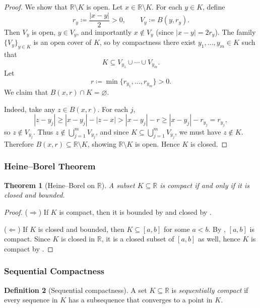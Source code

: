 \documentclass[12pt]{article}
\numberwithin{equation}{section}
\def\abs#1{|#1|}
\newcommand{\RR}{\mathbb{R}}
\let\emptyset\varnothing
\DeclarePairedDelimiter{\abs}{\lvert}{\rvert}
\theoremstyle{plain}
\newtheorem{theorem}{Theorem}[section]
\theoremstyle{definition}
\newtheorem{definition}[theorem]{Definition}
\theoremstyle{remark}
\begin{document}
\begin{proof}
We show that $\RR\setminus K$ is open.
Let $x\in \RR\setminus K$. For each $y\in K$, define
\[
r_y \coloneqq \frac{\abs{x-y}}{2} > 0,
\qquad
V_y \coloneqq B(y,r_y).
\]
Then $V_y$ is open, $y\in V_y$, and importantly $x\notin V_y$ (since $\abs{x-y}=2r_y$).
The family $\{V_y\}_{y\in K}$ is an open cover of $K$, so by compactness there exist $y_1,\dots,y_m\in K$ such that
\[
K \subseteq V_{y_1}\cup\cdots\cup V_{y_m}.
\]
Let
\[
r \coloneqq \min\{r_{y_1},\dots,r_{y_m}\} > 0.
\]
We claim that $B(x,r)\cap K=\emptyset$.

Indeed, take any $z\in B(x,r)$. For each $j$,
\[
\abs{z-y_j} \ge \abs{x-y_j} - \abs{z-x} > \abs{x-y_j} - r \ge \abs{x-y_j} - r_{y_j} = r_{y_j},
\]
so $z\notin V_{y_j}$.
Thus $z\notin \bigcup_{j=1}^m V_{y_j}$, and since $K\subseteq \bigcup_{j=1}^m V_{y_j}$, we must have $z\notin K$.
Therefore $B(x,r)\subseteq \RR\setminus K$, showing $\RR\setminus K$ is open.
Hence $K$ is closed.
\end{proof}

\subsubsection{Heine--Borel Theorem}

\begin{theorem}[Heine--Borel on $\RR$]\label{thm:heine-borel-R}
A subset $K\subseteq\RR$ is compact if and only if it is closed and bounded.
\end{theorem}

\begin{proof}
($\Rightarrow$) If $K$ is compact, then it is bounded by  and closed by .

($\Leftarrow$) If $K$ is closed and bounded, then $K\subseteq [a,b]$ for some $a<b$.
By , $[a,b]$ is compact. Since $K$ is closed in $\RR$, it is a closed subset of $[a,b]$ as well,
hence $K$ is compact by .
\end{proof}

\subsubsection{Sequential Compactness}

\begin{definition}[Sequential compactness]\label{def:sequential-compact}
A set $K\subseteq\RR$ is \emph{sequentially compact} if every sequence in $K$ has a subsequence that converges to a point in $K$.
\end{definition}
\end{document}
